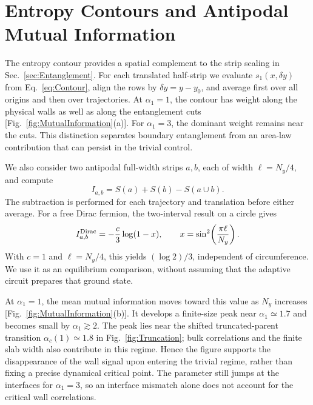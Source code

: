 \documentclass[aps,prb,10pt,twocolumn,superscriptaddress,longbibliography,floatfix]{revtex4-2}
\begin{document}
{\color{blue}
\section{Entropy Contours and Antipodal Mutual Information}
\label{app:MutualInformation}

The entropy contour provides a spatial complement to the strip scaling in Sec.~\ref{sec:Entanglement}. For each translated half-strip we evaluate $s_1(x,\delta y)$ from Eq.~\eqref{eq:Contour}, align the rows by $\delta y=y-y_0$, and average first over all origins and then over trajectories. At $\alpha_1=1$, the contour has weight along the physical walls as well as along the entanglement cuts [Fig.~\ref{fig:MutualInformation}(a)]. For $\alpha_1=3$, the dominant weight remains near the cuts. This distinction separates boundary entanglement from an area-law contribution that can persist in the trivial control.

We also consider two antipodal full-width strips $a,b$, each of width $\ell=N_y/4$, and compute
\begin{equation}
 I_{a,b}=S(a)+S(b)-S(a\cup b).
 \label{eq:MutualInformation}
\end{equation}
The subtraction is performed for each trajectory and translation before either average. For a free Dirac fermion, the two-interval result on a circle gives~\cite{CasiniHuerta2009,CalabreseCardyTonni2009}
\begin{equation}
 I^{\rm Dirac}_{a,b}=-\frac{c}{3}\log(1-x),\qquad
 x=\sin^2\!\left(\frac{\pi\ell}{N_y}\right).
 \label{eq:DiracMI}
\end{equation}
With $c=1$ and $\ell=N_y/4$, this yields $(\log2)/3$, independent of circumference. We use it as an equilibrium comparison, without assuming that the adaptive circuit prepares that ground state.

At $\alpha_1=1$, the mean mutual information moves toward this value as $N_y$ increases [Fig.~\ref{fig:MutualInformation}(b)]. It develops a finite-size peak near $\alpha_1\simeq1.7$ and becomes small by $\alpha_1\gtrsim2$. The peak lies near the shifted truncated-parent transition $\alpha_c(1)\simeq1.8$ in Fig.~\ref{fig:Truncation}; bulk correlations and the finite slab width also contribute in this regime. Hence the figure supports the disappearance of the wall signal upon entering the trivial regime, rather than fixing a precise dynamical critical point. The parameter still jumps at the interfaces for $\alpha_1=3$, so an interface mismatch alone does not account for the critical wall correlations.
}
\end{document}
